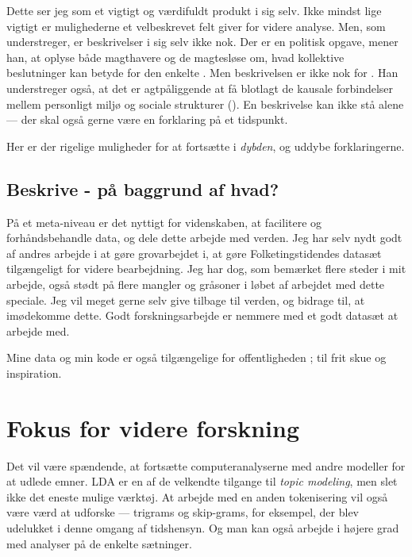 Dette ser jeg som et vigtigt og værdifuldt produkt i sig selv.
Ikke mindst lige vigtigt er mulighederne et velbeskrevet felt giver for videre analyse.
Men, som \citeauthor{millsSociologicalImagination2000} understreger, er beskrivelser i sig selv ikke nok.
Der er en politisk opgave, mener han, at oplyse både magthavere og de magtesløse om, hvad kollektive beslutninger kan betyde for den enkelte \autocite[s. ]{millsSociologicalImagination2000}.
Men beskrivelsen er ikke nok for \citeauthor{millsSociologicalImagination2000}.
Han understreger også, at det er agtpåliggende at få blotlagt de kausale forbindelser mellem personligt miljø og sociale strukturer (\citeyear[s. 130]{millsSociologicalImagination2000}).
En beskrivelse kan ikke stå alene — der skal også gerne være en forklaring på et tidspunkt.

Her er der rigelige muligheder for at fortsætte i \textit{dybden}, og uddybe forklaringerne.

\section{Beskrive - på baggrund af hvad?}

På et meta-niveau er det nyttigt for videnskaben,
at facilitere og forhåndsbehandle data,
og dele dette arbejde med verden.
Jeg har selv nydt godt af andres arbejde i at gøre grovarbejdet i,
at gøre Folketingstidendes datasæt tilgængeligt for videre bearbejdning.
Jeg har dog, som bemærket flere steder i mit arbejde, 
også stødt på flere mangler og gråsoner i løbet af arbejdet med dette speciale.
Jeg vil meget gerne selv give tilbage til verden, og bidrage til, at imødekomme dette.
Godt forskningsarbejde er nemmere med et godt datasæt at arbejde med.

Mine data og min kode er også tilgængelige for offentligheden \autocite{andersenNorseghostMasterthesis2020}; til frit skue og inspiration.

\chapter{Fokus for videre forskning}

Det vil være spændende, at fortsætte computeranalyserne med andre modeller for at udlede emner.
LDA er en af de velkendte tilgange til \textit{topic modeling}, men slet ikke det eneste mulige værktøj.
At arbejde med en anden tokenisering vil også være værd at udforske — 
trigrams og skip-grams, for eksempel, der blev udelukket i denne omgang af tidshensyn.
Og man kan også arbejde i højere grad med analyser på de enkelte sætninger.

